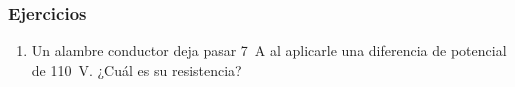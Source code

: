 \documentclass[14pt]{beamer}
\begin{document}
\begin{frame}
\frametitle{Ejercicios}
\begin{enumerate}[<+->]
\conti
\item Un alambre conductor deja pasar \SI{7}{\ampere} al aplicarle una diferencia de potencial de \SI{110}{\volt}. ¿Cuál es su resistencia?
\end{enumerate}
\end{frame}
    
\end{document}
